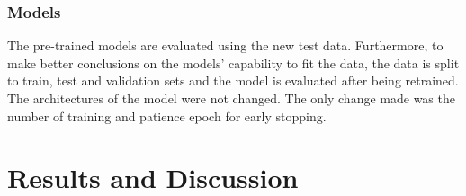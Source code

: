 \documentclass[a4paper,11pt]{article}
\begin{document}
\pagebreak

\subsubsection{Models}

The pre-trained models are evaluated using the new test data. Furthermore, to make better conclusions on the models' capability to fit the data, the data is split to train, test and validation sets and the model is evaluated after being retrained. The architectures of the model were not changed. The only change made was the number of training and patience epoch for early stopping. 


\section{Results and Discussion} \label{sec:results}

\pagebreak

\printbibliography
\end{document}
